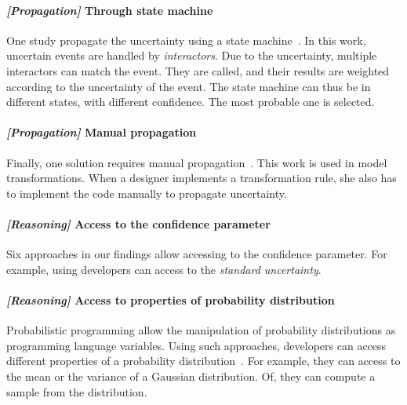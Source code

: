 \paragraph{\textit{[Propagation]} Through state machine}
One study propagate the uncertainty using a state machine~\cite{DBLP:conf/uist/SchwarzMH11}.
In this work, uncertain events are handled by \textit{interactors}.
Due to the uncertainty, multiple interactors can match the event.
They are called, and their results are weighted according to the uncertainty of the event.
The state machine can thus be in different states, with different confidence.
The most probable one is selected.

	
\paragraph{\textit{[Propagation]} Manual propagation}
Finally, one solution requires manual propagation~\cite{DBLP:conf/models/BurguenoBMV18}.
This work is used in model transformations.
When a designer implements a transformation rule, she also has to implement the code manually to propagate uncertainty.
	
\paragraph{\textit{[Reasoning]} Access to the confidence parameter}
Six approaches in our findings allow accessing to the confidence parameter.
For example, using  \cite{DBLP:conf/quatic/VallecilloMO16} developers can access to the \textit{standard uncertainty}.
	
\paragraph{\textit{[Reasoning]} Access to properties of probability distribution}
Probabilistic programming allow the manipulation of probability distributions as programming language variables.
Using such approaches, developers can access different properties of a probability distribution~\cite{baudin2017openturns, DBLP:conf/asplos/BornholtMM14, DBLP:journals/corr/BorgstromGGMG13, osti_1430202, DBLP:journals/peerj-cs/SalvatierWF16, DBLP:conf/popl/BhatAVG12, DBLP:conf/aistats/ChagantyNR13, DBLP:journals/siamsc/JaroszewiczK12, DBLP:journals/toplas/ParkPT08, DBLP:conf/ijcai/Pfeffer01, DBLP:conf/popl/RamseyP02, DBLP:conf/pldi/SankaranarayananCG13, DBLP:conf/icra/Thrun00, DBLP:journals/sac/LunnTBS00, plummer2003jags}.
For example, they can access to the mean or the variance of a Gaussian distribution.
Of, they can compute a sample from the distribution.
	
